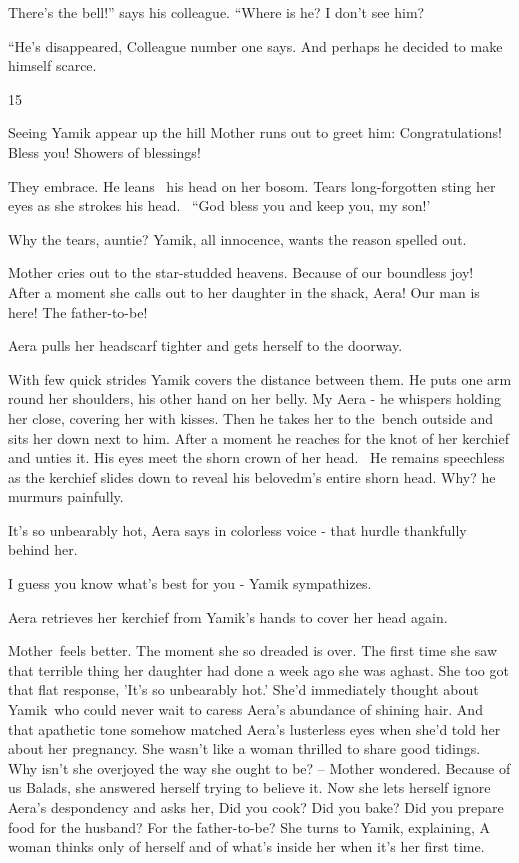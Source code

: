 \documentclass[letterpaper]{article}
\begin{document}
{\textquotedbl}There's the bell!'' says his colleague. ``Where is he? I don't see him?{\textquotedbl} 

{}``He's disappeared,{\textquotedbl} Colleague number one says. {\textquotedbl}And perhaps he decided to make himself
scarce.{\textquotedbl}


\bigskip

15~~

Seeing Yamik appear up the hill Mother runs out to greet him: {\textquotedbl}Congratulations! Bless you! Showers of
blessings!{\textquotedbl} 

They embrace. He leans \ his head on her bosom. Tears long-forgotten sting her eyes as she strokes his head. \ {}``God
bless you and keep you, my son!' 

{\textquotedbl}Why the tears, auntie?{\textquotedbl} Yamik, all innocence, wants the reason spelled out. 

Mother cries out to the star-studded heavens. {\textquotedbl}Because of our boundless joy!{\textquotedbl}~ After a
moment she calls out to her daughter in the shack, {\textquotedbl}Aera! Our man is here! The
father-to-be!{\textquotedbl}

Aera pulls her headscarf tighter and gets herself to the doorway.

With few quick strides Yamik covers the distance between them. He puts one arm round her shoulders, his other hand on
her belly. {\textquotedbl}My Aera -{\textquotedbl} he whispers holding her close, covering her with kisses. Then he
takes her to the~bench outside and sits her down next to him. After a moment he reaches for the knot of her kerchief
and unties it. His eyes meet the shorn crown of her head. \ He remains speechless as the kerchief slides down to reveal
his belovedm's entire shorn head. {\textquotedbl}Why?{\textquotedbl} he murmurs painfully. 

{\textquotedbl}It's so unbearably hot,{\textquotedbl} Aera says in colorless voice - that hurdle thankfully behind her. 

{\textquotedbl}I guess you know what's best for you -{\textquotedbl} Yamik sympathizes. 

Aera retrieves her kerchief from Yamik's hands to cover her head again.

Mother~feels better. The moment she so dreaded is over. The first time she saw that terrible thing her daughter had done
a week ago she was aghast. She too got that flat response, 'It's so unbearably hot.' She'd immediately thought about
Yamik~who could never wait to caress Aera's abundance of shining hair. And that apathetic tone somehow matched Aera's
lusterless eyes when she'd told her about her pregnancy. She wasn't like a woman thrilled to share good tidings. Why
isn't she overjoyed the way she ought to be? -- Mother wondered. Because of us Balads, she answered herself trying to
believe it. Now she lets herself ignore Aera's despondency and asks her, {\textquotedbl}Did you cook? Did you bake? Did
you prepare food for the husband? For the father-to-be?{\textquotedbl} She turns to Yamik, explaining, {\textquotedbl}A
woman thinks only of herself and of what's inside her when it's her first time.{\textquotedbl}
\end{document}
